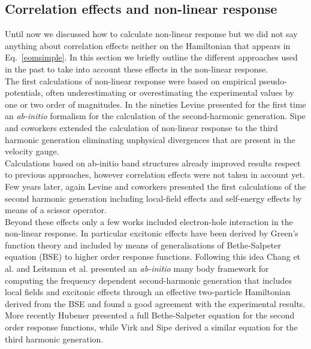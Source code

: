 \subsection{Correlation effects and non-linear response}
Until now we discussed how to calculate non-linear response but we did not say anything about correlation effects neither on the Hamiltonian that appears in Eq.~\ref{eomsimple}. In this section we  briefly outline the different approaches used in the past to take into account these effects in the non-linear response.\\
The first calculations of non-linear response were based on empirical pseudo-potentials, often underestimating or overestimating the experimental values by one or two order of magnitudes.\cite{PhysRevB.12.2325,PhysRevB.36.9708}
In the nineties Levine\cite{PhysRevB.42.3567} presented for the first time an \emph{ab-initio} formalism for the calculation of the second-harmonic generation. Sipe and coworkers extended the calculation of non-linear response to the third harmonic generation eliminating  unphysical divergences that are present in the velocity gauge.\cite{PhysRevB.61.5337,PhysRevB.48.11705}\\ 
Calculations based on ab-initio band structures already improved results respect to previous approaches, however correlation effects were not taken in account yet. Few years later, again Levine and coworkers presented the first calculations of the second harmonic generation including local-field effects and self-energy effects by means of a scissor operator.\cite{PhysRevLett.63.1719,PhysRevB.56.1787} \\
Beyond these effects only a few works included electron-hole interaction in the non-linear response. In particular excitonic effects have been derived by Green's function theory and included by means of generalisations of Bethe-Salpeter equation (BSE)\cite{strinati} to higher order response functions. Following this idea Chang et al.\cite{Chang2002}  and Leitsman et al.\cite{Leitsmann2005} presented an \emph{ab-initio} many body framework for computing the frequency dependent second-harmonic generation that includes local fields and excitonic effects through an effective two-particle Hamiltonian derived from the BSE and found a good agreement with the experimental results.\\
More recently Hubener\cite{PhysRevA.83.062122} presented a full Bethe-Salpeter equation for the second order response functions, while Virk and Sipe derived a similar equation for the third harmonic generation.\cite{PhysRevB.56.1787}\\
